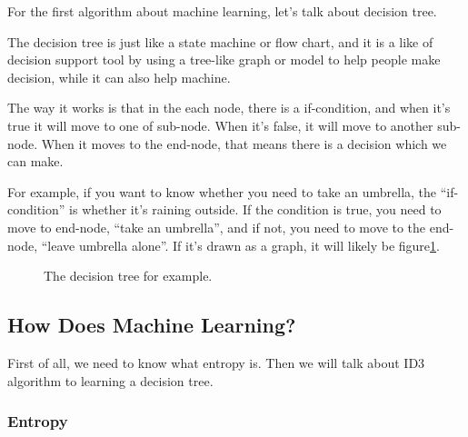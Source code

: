 \documentclass{article}
\begin{document}
For the first algorithm about machine learning, let's talk about decision tree.

The decision tree is just like a state machine or flow chart, and it is a like of decision support tool
by using a tree-like graph or model to help people make decision, while it can also help machine.

The way it works is that in the each node, there is a if-condition, and when it's true it will move to
one of sub-node. When it's false, it will move to another sub-node. When it moves to the end-node,
that means there is a decision which we can make.

For example, if you want to know whether you need to take an umbrella, the ``if-condition'' is
whether it's raining outside. If the condition is true, you need to move to end-node, ``take an umbrella'',
and if not, you need to move to the end-node, ``leave umbrella alone''.
If it's drawn as a graph, it will likely be figure\ref{fig:dt:eg}.

\begin{figure}
  \centering
  \caption{The decision tree for example.}
  \label{fig:dt:eg}
\end{figure}

\subsection{How Does Machine Learning?}
\label{sec:dt:how}

First of all, we need to know what entropy is.
Then we will talk about ID3 algorithm to learning a decision tree.

\subsubsection{Entropy}
\label{sec:dt:how:entropy}
\end{document}
